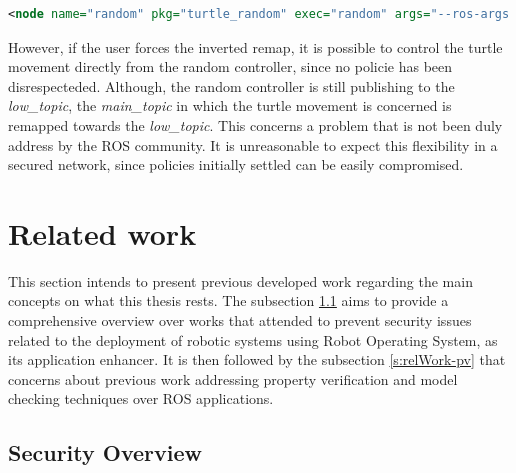 \begin{lstlisting}[title={Attempting the \textit{low\_topic} remap.}, language=xml]
<node name="random" pkg="turtle_random" exec="random" args="--ros-args --enclave /random -r /low_topic:=/main_topic"/>
\end{lstlisting}

However, if the user forces the inverted remap, it is possible to control the turtle movement directly from the random controller, since no policie has been disrespecteded. Although, the random controller is still publishing to the \textit{low\_topic}, the \textit{main\_topic} in which the turtle movement is concerned is remapped towards the \textit{low\_topic}. This concerns a problem that is not been duly address by the ROS community. It is unreasonable to expect this flexibility in a secured network, since policies initially settled can be easily compromised.

\section{Related work}\label{s:relWork}

This section intends to present previous developed work regarding the main concepts on what this thesis rests. The subsection \ref{s:relWork-sec} aims to provide a comprehensive overview over works that attended to prevent security issues related to the deployment of robotic systems using Robot Operating System, as its application enhancer. It is then followed by the subsection %
\ref{s:relWork-pv} that concerns about previous work addressing property verification and model checking techniques over ROS applications.

\subsection{Security Overview}\label{s:relWork-sec}



